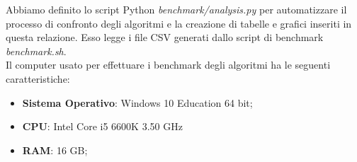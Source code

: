 \noindent Abbiamo definito lo script Python \textit{benchmark/analysis.py} per automatizzare il processo di confronto degli algoritmi e la creazione di tabelle e grafici inseriti in questa relazione. Esso legge i file CSV generati dallo script di benchmark \textit{benchmark.sh}. \\

\noindent Il computer usato per effettuare i benchmark degli algoritmi ha le seguenti caratteristiche:

\begin{itemize}
    \item \textbf{Sistema Operativo}: Windows 10 Education 64 bit;
    \item \textbf{CPU}: Intel Core i5 6600K 3.50 GHz
    \item \textbf{RAM}: 16 GB;
\end{itemize}
